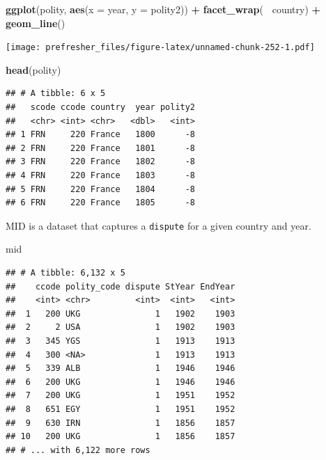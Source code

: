 \documentclass[]{book}
\newenvironment{Shaded}{\begin{snugshade}}{\end{snugshade}}
\newcommand{\DataTypeTok}[1]{\textcolor[rgb]{0.13,0.29,0.53}{#1}}
\newcommand{\KeywordTok}[1]{\textcolor[rgb]{0.13,0.29,0.53}{\textbf{#1}}}
\newcommand{\NormalTok}[1]{#1}
\newcommand{\OperatorTok}[1]{\textcolor[rgb]{0.81,0.36,0.00}{\textbf{#1}}}
\newcommand{\StringTok}[1]{\textcolor[rgb]{0.31,0.60,0.02}{#1}}
\theoremstyle{definition}
\theoremstyle{definition}
\theoremstyle{definition}
\theoremstyle{remark}
\begin{document}
\begin{Shaded}
\begin{Highlighting}[]
\KeywordTok{ggplot}\NormalTok{(polity, }\KeywordTok{aes}\NormalTok{(}\DataTypeTok{x =}\NormalTok{ year, }\DataTypeTok{y =}\NormalTok{ polity2)) }\OperatorTok{+}
\StringTok{  }\KeywordTok{facet_wrap}\NormalTok{(}\OperatorTok{~}\StringTok{ }\NormalTok{country) }\OperatorTok{+}
\StringTok{  }\KeywordTok{geom_line}\NormalTok{()}
\end{Highlighting}
\end{Shaded}

\texttt{[image: prefresher\_files/figure-latex/unnamed-chunk-252-1.pdf]}

\begin{Shaded}
\begin{Highlighting}[]
\KeywordTok{head}\NormalTok{(polity)}
\end{Highlighting}
\end{Shaded}

\begin{verbatim}
## # A tibble: 6 x 5
##   scode ccode country  year polity2
##   <chr> <int> <chr>   <dbl>   <int>
## 1 FRN     220 France   1800      -8
## 2 FRN     220 France   1801      -8
## 3 FRN     220 France   1802      -8
## 4 FRN     220 France   1803      -8
## 5 FRN     220 France   1804      -8
## 6 FRN     220 France   1805      -8
\end{verbatim}

MID is a dataset that captures a \texttt{dispute} for a given country and year.

\begin{Shaded}
\begin{Highlighting}[]
\NormalTok{mid}
\end{Highlighting}
\end{Shaded}

\begin{verbatim}
## # A tibble: 6,132 x 5
##    ccode polity_code dispute StYear EndYear
##    <int> <chr>         <int>  <int>   <int>
##  1   200 UKG               1   1902    1903
##  2     2 USA               1   1902    1903
##  3   345 YGS               1   1913    1913
##  4   300 <NA>              1   1913    1913
##  5   339 ALB               1   1946    1946
##  6   200 UKG               1   1946    1946
##  7   200 UKG               1   1951    1952
##  8   651 EGY               1   1951    1952
##  9   630 IRN               1   1856    1857
## 10   200 UKG               1   1856    1857
## # ... with 6,122 more rows
\end{verbatim}
\end{document}
